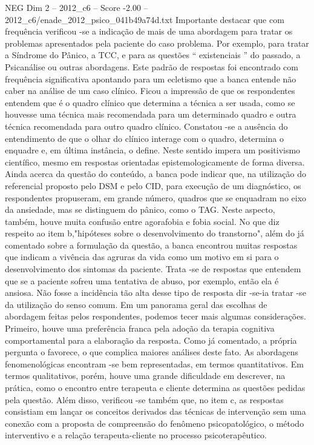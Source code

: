\begin{textsample}{NEG Dim 2 – 2012\_c6 – Score -2.00 – 2012\_c6/enade\_2012\_psico\_041b49a74d.txt}
Importante destacar que com frequência verificou -se a indicação de mais de uma abordagem para tratar os problemas apresentados pela paciente do caso problema.
Por exemplo, para tratar a Síndrome do Pânico, a TCC, e para as questões “ existenciais ” do passado, a Psicanálise ou outras abordagens.
Este padrão de respostas foi encontrado com frequência significativa apontando para um ecletismo que a banca entende não caber na análise de um caso clínico.
Ficou a impressão de que os respondentes entendem que é o quadro clínico que determina a técnica a ser usada, como se houvesse uma técnica mais recomendada para um determinado quadro e outra técnica recomendada para outro quadro clínico.
Constatou -se a ausência do entendimento de que o olhar do clínico interage com o quadro, determina o enquadre e, em última instância, o define.
Neste sentido impera um positivismo científico, mesmo em respostas orientadas epistemologicamente de forma diversa.
Ainda acerca da questão do conteúdo, a banca pode indicar que, na utilização do referencial proposto pelo DSM e pelo CID, para execução de um diagnóstico, os respondentes propuseram, em grande número, quadros que se enquadram no eixo da ansiedade, mas se distinguem do pânico, como o TAG.
Neste aspecto, também, houve muita confusão entre agorafobia e fobia social.
No que diz respeito ao item b,"hipóteses sobre o desenvolvimento do transtorno", além do já comentado sobre a formulação da questão, a banca encontrou muitas respostas que indicam a vivência das agruras da vida como um motivo em si para o desenvolvimento dos sintomas da paciente.
Trata -se de respostas que entendem que se a paciente sofreu uma tentativa de abuso, por exemplo, então ela é ansiosa.
Não fosse a incidência tão alta desse tipo de resposta dir -se-ia tratar -se da utilização do senso comum.
Em um panorama geral das escolhas de abordagem feitas pelos respondentes, podemos tecer mais algumas considerações.
Primeiro, houve uma preferência franca pela adoção da terapia cognitiva comportamental para a elaboração da resposta.
Como já comentado, a própria pergunta o favorece, o que complica maiores análises deste fato.
As abordagens fenomenológicas encontram -se bem representadas, em termos quantitativos.
Em termos qualitativos, porém, houve uma grande dificuldade em descrever, na prática, como o encontro entre terapeuta e cliente determina as questões pedidas pela questão.
Além disso, verificou -se também que, no item c, as respostas consistiam em lançar os conceitos derivados das técnicas de intervenção sem uma conexão com a proposta de compreensão do fenômeno psicopatológico, o método interventivo e a relação terapeuta-cliente no processo psicoterapêutico.

\end{textsample}
